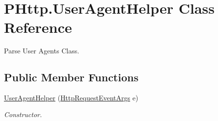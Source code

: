 \hypertarget{class_p_http_1_1_user_agent_helper}{}\section{P\+Http.\+User\+Agent\+Helper Class Reference}
\label{class_p_http_1_1_user_agent_helper}


Parse User Agents Class.  


\subsection*{Public Member Functions}
\begin{DoxyCompactItemize}
\item 
\hyperlink{class_p_http_1_1_user_agent_helper_ac67229485cfd30f4431fae09a46de294}{User\+Agent\+Helper} (\hyperlink{class_p_http_1_1_http_request_event_args}{Http\+Request\+Event\+Args} e)
\begin{DoxyCompactList}\small\item\em Constructor. \end{DoxyCompactList}\end{DoxyCompactItemize}
